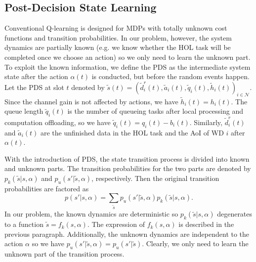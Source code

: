 \documentclass[lettersize, journal]{IEEEtran}
\begin{document}
\subsection{Post-Decision State Learning} \label{subsection:pds_learning}
Conventional Q-learning is designed for MDPs with totally unknown cost functions and transition probabilities.
In our problem, however, the system dynamics are partially known
(e.g. we know whether the HOL task will be completed once we choose an action)
so we only need to learn the unknown part.
To exploit the known information, we define the PDS as the intermediate system state after the action $\alpha(t)$ is conducted,
but before the random events happen.
Let the PDS at slot $t$ denoted by $\tilde{s}(t) = (\tilde{d}^r_i(t), \tilde{a}_i(t), \tilde{q}_i(t), \tilde{h}_i(t))_{i\in\mathcal{N}}$.
Since the channel gain is not affected by actions, we have $\tilde{h}_i(t) = h_i(t)$.
The queue length $\tilde{q}_i(t)$ is the number of queueing tasks after local processing and computation offloading,
so we have $\tilde{q}_i(t) = q_i(t) - b_i(t)$.
Similarly, $\tilde{d}^r_i(t)$ and $\tilde{a}_i(t)$ are the unfinished data in the HOL task and the AoI of WD $i$ after $\alpha(t)$.

With the introduction of PDS, the state transition process is divided into known and unknown parts.
The transition probabilities for the two parts are denoted by $p_k(\tilde{s} | s, \alpha)$ and $p_u(s'|\tilde{s}, \alpha)$, respectively.
Then the original transition probabilities are factored as
\begin{equation*}
    p(s' | s, \alpha) = \sum_{\tilde{s}} p_u(s'|\tilde{s}, \alpha) p_k(\tilde{s}|s, \alpha).
\end{equation*}
In our problem, the known dynamics are deterministic so $p_k(\tilde{s} | s, \alpha)$ degenerates to a function $\tilde{s} = f_k(s, \alpha)$.
The expression of $f_k(s, \alpha)$ is described in the previous paragraph.
Additionally, the unknown dynamics are independent to the action $\alpha$ so we have $p_u(s' | \tilde{s}, \alpha) = p_u(s' | \tilde{s})$.
Clearly, we only need to learn the unknown part of the transition process.
\end{document}
